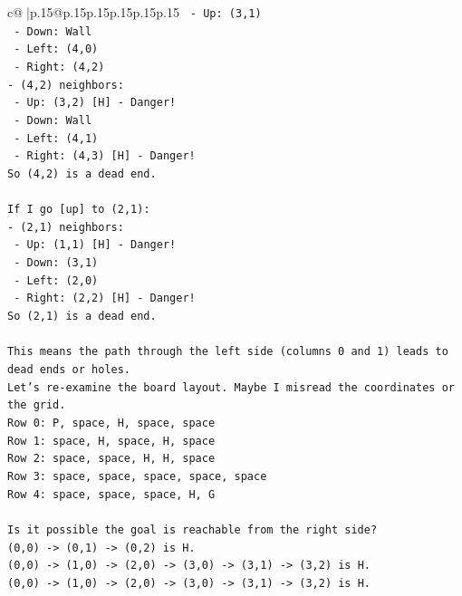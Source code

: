 \documentclass{article}
\begin{document}
{\begin{supertabular}{c@{$\;$}|p{.15\linewidth}@{}p{.15\linewidth}p{.15\linewidth}p{.15\linewidth}p{.15\linewidth}p{.15\linewidth}}
{{{\texttt{  {-} Up: (3,1)} \\
\texttt{  {-} Down: Wall} \\
\texttt{  {-} Left: (4,0)} \\
\texttt{  {-} Right: (4,2)} \\
\texttt{{-} (4,2) neighbors:} \\
\texttt{  {-} Up: (3,2) {[}H{]} {-} Danger!} \\
\texttt{  {-} Down: Wall} \\
\texttt{  {-} Left: (4,1)} \\
\texttt{  {-} Right: (4,3) {[}H{]} {-} Danger!} \\
\texttt{So (4,2) is a dead end.} \\
\\ 
\texttt{If I go {[}up{]} to (2,1):} \\
\texttt{{-} (2,1) neighbors:} \\
\texttt{  {-} Up: (1,1) {[}H{]} {-} Danger!} \\
\texttt{  {-} Down: (3,1)} \\
\texttt{  {-} Left: (2,0)} \\
\texttt{  {-} Right: (2,2) {[}H{]} {-} Danger!} \\
\texttt{So (2,1) is a dead end.} \\
\\ 
\texttt{This means the path through the left side (columns 0 and 1) leads to dead ends or holes.} \\
\texttt{Let's re{-}examine the board layout. Maybe I misread the coordinates or the grid.} \\
\texttt{Row 0: P, space, H, space, space} \\
\texttt{Row 1: space, H, space, H, space} \\
\texttt{Row 2: space, space, H, H, space} \\
\texttt{Row 3: space, space, space, space, space} \\
\texttt{Row 4: space, space, space, H, G} \\
\\ 
\texttt{Is it possible the goal is reachable from the right side?} \\
\texttt{(0,0) {-}> (0,1) {-}> (0,2) is H.} \\
\texttt{(0,0) {-}> (1,0) {-}> (2,0) {-}> (3,0) {-}> (3,1) {-}> (3,2) is H.} \\
\texttt{(0,0) {-}> (1,0) {-}> (2,0) {-}> (3,0) {-}> (3,1) {-}> (3,2) is H.} \\
\\ 
}}}
\end{supertabular}}
\end{document}
